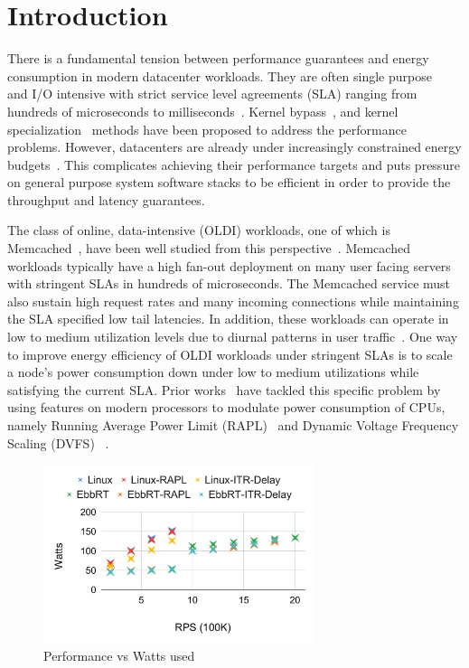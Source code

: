 \documentclass[letterpaper,twocolumn,10pt]{article}
\begin{document}
\section{Introduction}
There is a fundamental tension between performance guarantees and energy consumption in modern datacenter workloads. They are often single purpose~\cite{workloadanalysisfacebook, WebSearch, svefacebook, profilewhscomputer} and I/O intensive with strict service level agreements (SLA) ranging from hundreds of microseconds to milliseconds~\cite{tailatscale, scalingmcdfacebook}. Kernel bypass~\cite{ix, farm, dpdk, arrakis}, and kernel specialization~\cite{rumpkernel, unikernels, ebbrt} methods have been proposed to address the performance problems. However, datacenters are already under increasingly constrained energy budgets~\cite{SmoothOperator, Dynamo}. This complicates achieving their performance targets and puts pressure on general purpose system software stacks to be efficient in order to provide the throughput and latency guarantees.

The class of online, data-intensive (OLDI) workloads, one of which is Memcached~\cite{memcached}, have been well studied from this perspective~\cite{10.1145/2678373.2665718, 10.1145/2806777.2806848, 10.1145/2024723.2000103, napsac}. Memcached workloads typically have a high fan-out deployment on many user facing servers with stringent SLAs in hundreds of microseconds. The Memcached service must also sustain high request rates and many incoming connections while maintaining the SLA specified low tail latencies. In addition, these workloads can operate in low to medium utilization levels due to diurnal patterns in user traffic~\cite{workloadanalysisfacebook, 10.1145/2024723.2000103}. One way to improve energy efficiency of OLDI workloads under stringent SLAs is to scale a node's power consumption down under low to medium utilizations while satisfying the current SLA. Prior works~\cite{10.1145/2678373.2665718, 10.1145/2806777.2806848} have tackled this specific problem by using features on modern processors to modulate power consumption of CPUs, namely Running Average Power Limit (RAPL)~\cite{intel_rapl} and Dynamic Voltage Frequency Scaling (DVFS) ~\cite{cpufreq_governor}.

\begin{figure}
  \includegraphics[width=7.9cm]{chart.pdf}
  \caption{Performance vs Watts used}
  \label{fig:chart}
\end{figure}
\end{document}
